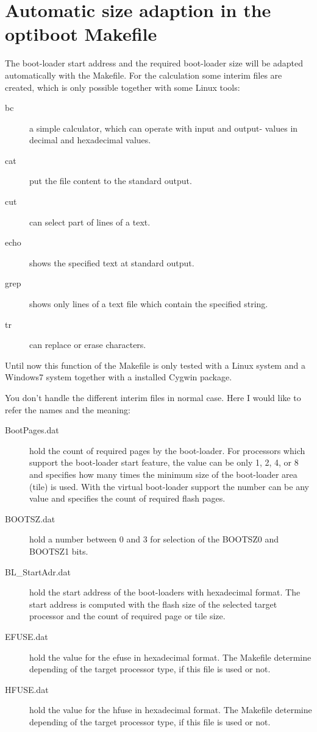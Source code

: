 \section{Automatic size adaption in the optiboot Makefile}

The boot-loader start address and the required boot-loader size will
be adapted automatically with the Makefile.
For the calculation some interim files are created,
which is only possible together with some Linux tools:

\begin{description}
\item [bc] a simple calculator, which can operate with input and output-
values in decimal and hexadecimal values.
\item [cat] put the file content to the standard output.
\item [cut] can select part of lines of a text.
\item [echo] shows the specified text at standard output.
\item [grep] shows only lines of a text file which contain the specified string.
\item [tr] can replace or erase characters.
\end{description}

Until now this function of the Makefile is only tested with a Linux system
and a Windows7 system together with a installed Cygwin package.

You don't handle the different interim files in normal case.
Here I would like to refer the names and the meaning:
\begin{description}
\item [BootPages.dat] hold the count of required pages by the boot-loader.
For processors which support the boot-loader start feature, the value can be only 1, 2, 4, or 8 and
specifies how many times the minimum size of the boot-loader area (tile) is used.
With the virtual boot-loader support the number can be any value and
specifies the count of required flash pages.
\item [BOOTSZ.dat] hold a number between 0 and 3 for selection of the  BOOTSZ0 and BOOTSZ1 bits.
\item [BL\_StartAdr.dat] hold the start address of the boot-loaders with hexadecimal format.
The start address is computed with the flash size of the selected target processor and
the count of required page or tile size.
\item [EFUSE.dat] hold the value for the efuse in hexadecimal format.
The Makefile determine depending of the target processor type,
if this file is used or not.
\item [HFUSE.dat] hold the value for the hfuse in hexadecimal format.
The Makefile determine depending of the target processor type,
if this file is used or not.
\end{description}

